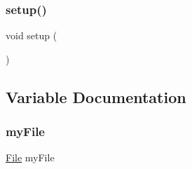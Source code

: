 \subsubsection{\texorpdfstring{setup()}{setup()}}
{\footnotesize\ttfamily void setup (\begin{DoxyParamCaption}{ }\end{DoxyParamCaption})}



\subsection{Variable Documentation}
\mbox{\label{_files_8ino_a8eb13a6b9ea8026221cb3a45a822526a}} 
\subsubsection{\texorpdfstring{my\+File}{myFile}}
{\footnotesize\ttfamily \hyperlink{class_s_d_lib_1_1_file}{File} my\+File}

